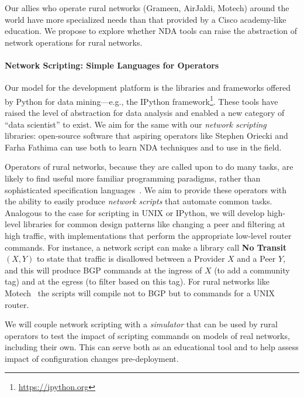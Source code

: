 Our allies who operate rural networks (Grameen, AirJaldi, Motech) around the world have more specialized needs than that provided by a Cisco academy-like education. We propose to explore whether NDA tools can raise
the abstraction of network operations for rural networks.



\paragraph*{Network Scripting: Simple Languages for Operators}
%
Our model for the development platform is the libraries and frameworks offered by Python for data mining---e.g., the IPython framework\footnote{\url{https://ipython.org}}. These tools have raised the level of abstraction for data analysis and enabled a new category of ``data scientist'' to exist. We aim for the same with our \emph{network scripting} libraries: open-source software that aspiring operators like Stephen Oriecki and Farha Fathima can use both to learn NDA techniques and to use in the field.

Operators of rural networks, because they are called upon to do many tasks, are likely to find useful more familiar programming paradigms, rather than sophisticated specification languages~\cite{netkat,propane}.  We aim to provide these operators with the ability to easily produce \emph{network scripts} that automate common tasks. Analogous to the case for scripting in UNIX or IPython, we will develop high-level libraries for common design patterns like changing a peer and filtering at high traffic, with implementations that perform the appropriate low-level router commands.  For instance, a network script can make a library call {\bf No Transit $(X, Y)$} to state that traffic is disallowed between a Provider $X$ and a Peer $Y$, and this will produce BGP commands at the ingress of $X$ (to add a community tag) and at the egress (to filter based on this tag).  For rural networks like Motech~\cite{barathwisp} the scripts will compile not to BGP but to commands for a UNIX router.

We will couple network scripting with a \emph{simulator} that can be used by rural operators to test the impact of scripting commands on models of real networks, including their own. This can serve both as an educational tool and to help assess impact of configuration changes pre-deployment.

